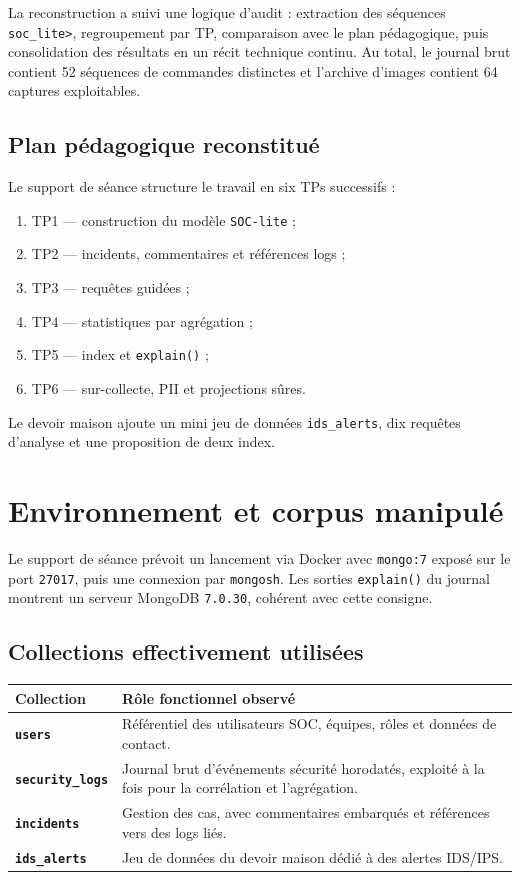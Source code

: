 \documentclass[11pt,a4paper]{article}
\begin{document}
La reconstruction a suivi une logique d'audit : extraction des séquences \texttt{soc\_lite>}, regroupement par TP, comparaison avec le plan pédagogique, puis consolidation des résultats en un récit technique continu. Au total, le journal brut contient 52 séquences de commandes distinctes et l'archive d'images contient 64 captures exploitables.

\subsection{Plan pédagogique reconstitué}

Le support de séance structure le travail en six TPs successifs :

\begin{enumerate}[leftmargin=1.2cm]
\item TP1 --- construction du modèle \texttt{SOC-lite} ;
\item TP2 --- incidents, commentaires et références logs ;
\item TP3 --- requêtes guidées ;
\item TP4 --- statistiques par agrégation ;
\item TP5 --- index et \texttt{explain()} ;
\item TP6 --- sur-collecte, PII et projections sûres.
\end{enumerate}

Le devoir maison ajoute un mini jeu de données \texttt{ids\_alerts}, dix requêtes d'analyse et une proposition de deux index.

\section{Environnement et corpus manipulé}

Le support de séance prévoit un lancement via Docker avec \texttt{mongo:7} exposé sur le port \texttt{27017}, puis une connexion par \texttt{mongosh}. Les sorties \texttt{explain()} du journal montrent un serveur MongoDB \texttt{7.0.30}, cohérent avec cette consigne.

\subsection{Collections effectivement utilisées}

\begin{tabularx}{\textwidth}{>{\bfseries}p{3.1cm}X}
\toprule
Collection & Rôle fonctionnel observé \\
\midrule
\texttt{users} & Référentiel des utilisateurs SOC, équipes, rôles et données de contact. \\
\texttt{security\_logs} & Journal brut d'événements sécurité horodatés, exploité à la fois pour la corrélation et l'agrégation. \\
\texttt{incidents} & Gestion des cas, avec commentaires embarqués et références vers des logs liés. \\
\texttt{ids\_alerts} & Jeu de données du devoir maison dédié à des alertes IDS/IPS. \\
\bottomrule
\end{tabularx}
\end{document}
